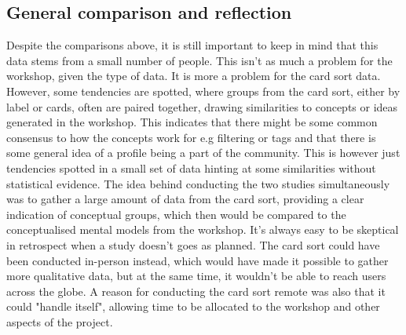 \subsection*{General comparison and reflection}
\label{CompareGeneral}
Despite the comparisons above, it is still important to keep in mind that this data stems from a small number of people. This isn't as much a problem for the workshop, given the type of data. It is more a problem for the card sort data. However, some tendencies are spotted, where groups from the card sort, either by label or cards, often are paired together, drawing similarities to concepts or ideas generated in the workshop. This indicates that there might be some common consensus to how the concepts work for e.g filtering or tags and that there is some general idea of a profile being a part of the community. This is however just tendencies spotted in a small set of data hinting at some similarities without statistical evidence. The idea behind conducting the two studies simultaneously was to gather a large amount of data from the card sort, providing a clear indication of conceptual groups, which then would be compared to the conceptualised mental models from the workshop. It's always easy to be skeptical in retrospect when a study doesn't goes as planned. The card sort could have been conducted in-person instead, which would have made it possible to gather more qualitative data, but at the same time, it wouldn't be able to reach users across the globe. A reason for conducting the card sort remote was also that it could "handle itself", allowing time to be allocated to the workshop and other aspects of the project.\\

